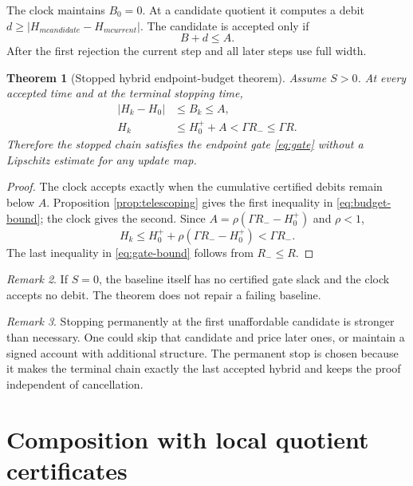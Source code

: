 \documentclass[11pt]{article}
\newtheorem{theorem}{Theorem}[section]
\theoremstyle{definition}
\theoremstyle{remark}
\newtheorem{remark}[theorem]{Remark}
\begin{document}
The clock maintains $B_0=0$.  At a candidate quotient it computes a debit
$d\ge|H_{
m candidate}-H_{
m current}|$.  The candidate is accepted only if
\begin{equation}
 B+d\le A.
 \label{eq:accept}
\end{equation}
After the first rejection the current step and all later steps use full
width.

\begin{theorem}[Stopped hybrid endpoint-budget theorem]
\label{thm:stopped}
Assume $S>0$.  At every accepted time and at the terminal stopping time,
\begin{align}
 |H_k-H_0|&\le B_k\le A,
 \label{eq:budget-bound}\\
 H_k&\le H_0^++A<\Gamma R_-\le\Gamma R.
 \label{eq:gate-bound}
\end{align}
Therefore the stopped chain satisfies the endpoint gate
\eqref{eq:gate} without a Lipschitz estimate for any update map.
\end{theorem}

\begin{proof}
The clock accepts exactly when the cumulative certified debits remain below
$A$.  Proposition \ref{prop:telescoping} gives the first inequality in
\eqref{eq:budget-bound}; the clock gives the second.  Since
$A=\rho(\Gamma R_--H_0^+)$ and $\rho<1$,
\[
 H_k\le H_0^++\rho(\Gamma R_--H_0^+)<\Gamma R_-.
\]
The last inequality in \eqref{eq:gate-bound} follows from $R_-\le R$.
\end{proof}

\begin{remark}
If $S=0$, the baseline itself has no certified gate slack and the clock
accepts no debit.  The theorem does not repair a failing baseline.
\end{remark}

\begin{remark}
Stopping permanently at the first unaffordable candidate is stronger than
necessary.  One could skip that candidate and price later ones, or maintain a
signed account with additional structure.  The permanent stop is chosen
because it makes the terminal chain exactly the last accepted hybrid and
keeps the proof independent of cancellation.
\end{remark}

\section{Composition with local quotient certificates}
\label{sec:composition}
\end{document}
